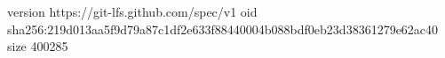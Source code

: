 version https://git-lfs.github.com/spec/v1
oid sha256:219d013aa5f9d79a87c1df2e633f88440004b088bdf0eb23d38361279e62ac40
size 400285
